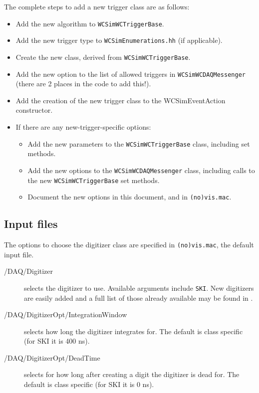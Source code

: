 The complete steps to add a new trigger class are as follows:
\begin{itemize}
\item Add the new algorithm to \texttt{WCSimWCTriggerBase}.
\item Add the new trigger type to \texttt{WCSimEnumerations.hh} (if applicable).
\item Create the new class, derived from \texttt{WCSimWCTriggerBase}.
\item Add the new option to the list of allowed triggers in \texttt{WCSimWCDAQMessenger} (there are 2 places in the code to add this!). 
\item Add the creation of the new trigger class to the WCSimEventAction constructor.
\item If there are any new-trigger-specific options:
  \begin{itemize}
  \item Add the new parameters to the \texttt{WCSimWCTriggerBase} class, including set methods.
  \item Add the new options to the \texttt{WCSimWCDAQMessenger} class, including calls to the new \texttt{WCSimWCTriggerBase} set methods.
  \item Document the new options in this document, and in \texttt{(no)vis.mac}.
  \end{itemize}
\end{itemize}


\subsection{Input files}
\label{sec:daq:options}

The options to choose the digitizer class are specified in \texttt{(no)vis.mac}, the default input file.
\begin{description}
\item[/DAQ/Digitizer] selects the digitizer to use. Available arguments include \texttt{SKI}. New digitizers are easily added and a full list of those already available may be found in .

\item[/DAQ/DigitizerOpt/IntegrationWindow] selects how long the digitizer integrates for. The default is class specific (for SKI it is 400 ns).
\item[/DAQ/DigitizerOpt/DeadTime] selects for how long after creating a digit the digitizer is dead for. The default is class specific (for SKI it is 0 ns).
\end{description}

